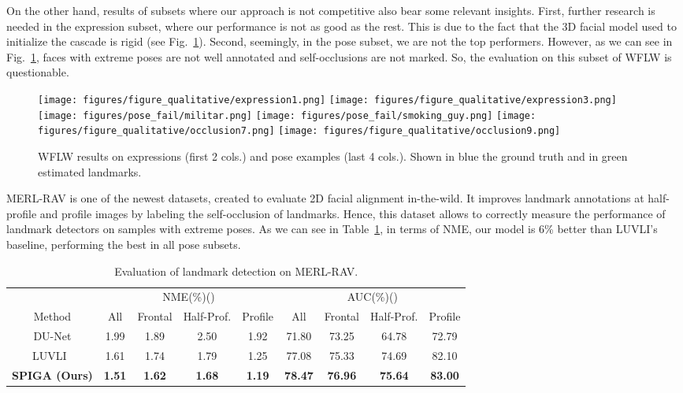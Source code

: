 \documentclass{bmvc2k}
\newcommand{\first}[1]{{\color{blue} \textbf{#1}}}
\begin{document}
On the other hand, results of subsets where our approach is not competitive also bear some relevant insights. First, further research is needed in the expression subset, where our performance is not as good as the rest. This is due to the fact that the 3D facial model used to initialize the cascade is rigid (see Fig.~\ref{fig:expresion_pose_wflw_qualitative}).
Second, seemingly, in the pose subset, we are not the top performers. However, as we can see in Fig.~\ref{fig:expresion_pose_wflw_qualitative}, faces with extreme poses are not well annotated and self-occlusions are not marked. So, the evaluation on this subset of WFLW is questionable.

\begin{figure}
    \centering
    \texttt{[image: figures/figure\_qualitative/expression1.png]}
    \texttt{[image: figures/figure\_qualitative/expression3.png]}
    \texttt{[image: figures/pose\_fail/militar.png]}
    \texttt{[image: figures/pose\_fail/smoking\_guy.png]}
    \texttt{[image: figures/figure\_qualitative/occlusion7.png]}
    \texttt{[image: figures/figure\_qualitative/occlusion9.png]}
    \caption{WFLW results on expressions (first 2 cols.) and pose examples (last 4 cols.). Shown in blue the ground truth and in green estimated landmarks.}
    \label{fig:expresion_pose_wflw_qualitative}
\end{figure}

MERL-RAV is one of the newest datasets, created to evaluate 2D facial alignment in-the-wild. It improves landmark annotations at half-profile and profile images by labeling the self-occlusion of landmarks.  
Hence, this dataset allows to correctly measure the performance of landmark detectors on samples with extreme poses. 
As we can see in Table~\ref{tab:merl_rav}, in terms of NME, our model is 6\% better than LUVLI's~\cite{Kumar20luvli} baseline, performing the best in all pose subsets. 

\begin{table}
\scriptsize
\begin{center}
\setlength{\tabcolsep}{4pt} 
\begin{tabular}{c|cccc|cccc}
  & \multicolumn{4}{c}{NME(\%)()} & \multicolumn{4}{|c}{AUC(\%)()} \\ 
  Method & All & Frontal & Half-Prof. & Profile & All & Frontal & Half-Prof.& Profile \\ 
\hline
DU-Net & 1.99 & 1.89 & 2.50 & 1.92 & 71.80 & 73.25 & 64.78 & 72.79\\ 
LUVLI~\cite{Kumar20luvli} & 1.61 & 1.74 & 1.79 & 1.25 & 77.08 & 75.33 & 74.69 & 82.10 \\
\hline
\textbf{SPIGA (Ours)} & \first{1.51} & \first{1.62} & \first{1.68} & \first{1.19} & \first{78.47} & \first{76.96} & \first{75.64} & \first{83.00} \\ 
\hline
\end{tabular}
\end{center}
\caption{Evaluation of landmark detection on MERL-RAV.}
\label{tab:merl_rav}
\end{table}
\end{document}

